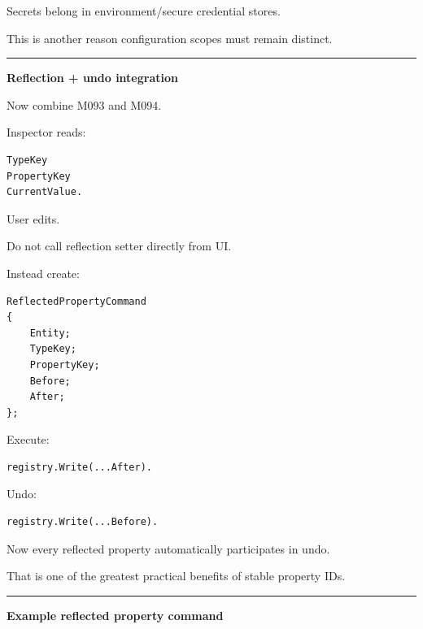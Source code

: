 Secrets belong in environment/secure credential stores.

This is another reason configuration scopes must remain distinct.

\begin{center}\rule{0.5\linewidth}{0.5pt}\end{center}

\textbf{Reflection + undo integration}

Now combine M093 and M094.

Inspector reads:

\begin{verbatim}
TypeKey
PropertyKey
CurrentValue.
\end{verbatim}

User edits.

Do not call reflection setter directly from UI.

Instead create:

\begin{verbatim}
ReflectedPropertyCommand
{
    Entity;
    TypeKey;
    PropertyKey;
    Before;
    After;
};
\end{verbatim}

Execute:

\begin{verbatim}
registry.Write(...After).
\end{verbatim}

Undo:

\begin{verbatim}
registry.Write(...Before).
\end{verbatim}

Now every reflected property automatically participates in undo.

That is one of the greatest practical benefits of stable property IDs.

\begin{center}\rule{0.5\linewidth}{0.5pt}\end{center}

\textbf{Example reflected property command}

